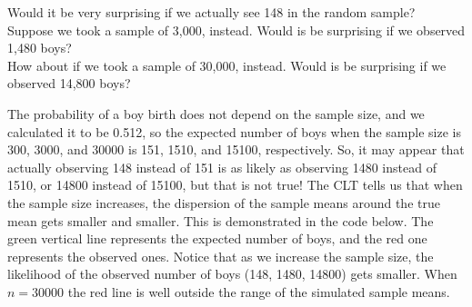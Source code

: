 Would it be very surprising if we actually see 148 in the random sample?\\
Suppose we took a sample of 3,000, instead. Would is be surprising if we observed 1,480 boys?\\
How about if we took a sample of 30,000, instead. Would is be surprising if we observed 14,800 boys?

The probability of a boy birth does not depend on the sample size, and we calculated it to be 0.512, so the expected number of boys when the sample size is 300, 3000, and 30000 is 151, 1510, and 15100, respectively. So, it may appear that actually observing 148 instead of 151 is as likely as observing 1480 instead of 1510, or 14800 instead of 15100, but that is not true!
The CLT tells us that when the sample size increases, the dispersion of the sample means around the true mean gets smaller and smaller. This is demonstrated in the code below. The green vertical line represents the expected number of boys, and the red one represents the observed ones. Notice that as we increase the sample size, the likelihood of the observed number of boys (148, 1480, 14800) gets smaller. When $n=30000$ the red line is well outside the range of the simulated sample means.

